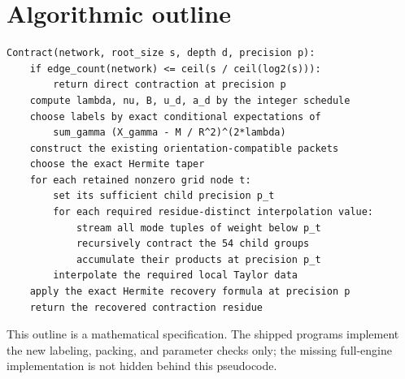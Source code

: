 \documentclass[11pt]{article}
\theoremstyle{remark}\newtheorem{remark}[theorem]{Remark}
\begin{document}
\clearpage\appendix
\section{Algorithmic outline}
\begin{lstlisting}
Contract(network, root_size s, depth d, precision p):
    if edge_count(network) <= ceil(s / ceil(log2(s))):
        return direct contraction at precision p
    compute lambda, nu, B, u_d, a_d by the integer schedule
    choose labels by exact conditional expectations of
        sum_gamma (X_gamma - M / R^2)^(2*lambda)
    construct the existing orientation-compatible packets
    choose the exact Hermite taper
    for each retained nonzero grid node t:
        set its sufficient child precision p_t
        for each required residue-distinct interpolation value:
            stream all mode tuples of weight below p_t
            recursively contract the 54 child groups
            accumulate their products at precision p_t
        interpolate the required local Taylor data
    apply the exact Hermite recovery formula at precision p
    return the recovered contraction residue
\end{lstlisting}
This outline is a mathematical specification. The shipped programs implement the new labeling, packing, and parameter checks only; the missing full-engine implementation is not hidden behind this pseudocode.
\end{document}
